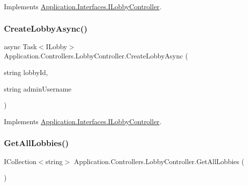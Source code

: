 Implements \mbox{\hyperlink{interface_application_1_1_interfaces_1_1_i_lobby_controller_abefe3510b20e3db41c4d8062f8cdc2bc}{Application.\+Interfaces.\+I\+Lobby\+Controller}}.

\mbox{\label{class_application_1_1_controllers_1_1_lobby_controller_ac08d941f7da12f7791a691dbbdf0c1f3}} 
\subsubsection{\texorpdfstring{Create\+Lobby\+Async()}{CreateLobbyAsync()}}
{\footnotesize\ttfamily async Task$<$I\+Lobby$>$ Application.\+Controllers.\+Lobby\+Controller.\+Create\+Lobby\+Async (\begin{DoxyParamCaption}\item[{string}]{lobby\+Id,  }\item[{string}]{admin\+Username }\end{DoxyParamCaption})}



Implements \mbox{\hyperlink{interface_application_1_1_interfaces_1_1_i_lobby_controller_ae507a1d23088662b8c37692bbb93040e}{Application.\+Interfaces.\+I\+Lobby\+Controller}}.

\mbox{\label{class_application_1_1_controllers_1_1_lobby_controller_a1aec115271209fc4ea59ed5f790d3011}} 
\subsubsection{\texorpdfstring{Get\+All\+Lobbies()}{GetAllLobbies()}}
{\footnotesize\ttfamily I\+Collection$<$string$>$ Application.\+Controllers.\+Lobby\+Controller.\+Get\+All\+Lobbies (\begin{DoxyParamCaption}{ }\end{DoxyParamCaption})}



